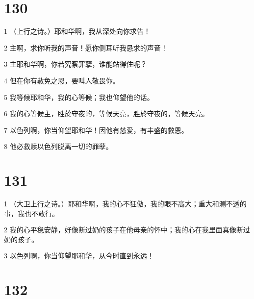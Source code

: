 \chapter{130}

\par 1 （上行之诗。）耶和华啊，我从深处向你求告！
\par 2 主啊，求你听我的声音！愿你侧耳听我恳求的声音！
\par 3 主耶和华啊，你若究察罪孽，谁能站得住呢？
\par 4 但在你有赦免之恩，要叫人敬畏你。
\par 5 我等候耶和华，我的心等候；我也仰望他的话。
\par 6 我的心等候主，胜於守夜的，等候天亮，胜於守夜的，等候天亮。
\par 7 以色列啊，你当仰望耶和华！因他有慈爱，有丰盛的救恩。
\par 8 他必救赎以色列脱离一切的罪孽。

\chapter{131}

\par 1 （大卫上行之诗。）耶和华啊，我的心不狂傲，我的眼不高大；重大和测不透的事，我也不敢行。
\par 2 我的心平稳安静，好像断过奶的孩子在他母亲的怀中；我的心在我里面真像断过奶的孩子。
\par 3 以色列啊，你当仰望耶和华，从今时直到永远！

\chapter{132}

